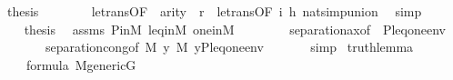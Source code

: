 \begin{isabellebody}
\ {\isacharquery}{\kern0pt}thesis\isanewline
\ \ \ \ \ \ \isamarkupfalse%
\ le{\isacharunderscore}{\kern0pt}trans{\isacharbrackleft}{\kern0pt}OF\ \ {\isacartoucheopen}arity{\isacharparenleft}{\kern0pt}{\isacharquery}{\kern0pt}{\isasympsi}{\isacharparenright}{\kern0pt}\ {\isasymle}\ {\isacharquery}{\kern0pt}r{\isacartoucheclose}\ \ le{\isacharunderscore}{\kern0pt}trans{\isacharbrackleft}{\kern0pt}OF\ i\ h{\isacharbrackright}{\kern0pt}{\isacharbrackright}{\kern0pt}\ nat{\isacharunderscore}{\kern0pt}simp{\isacharunderscore}{\kern0pt}union\ \isamarkupfalse%
\ simp\isanewline
\ \ \isamarkupfalse%
\isanewline
\ \ \isamarkupfalse%
\isanewline
\ \ \isamarkupfalse%
\ {\isacharquery}{\kern0pt}thesis\ \isamarkupfalse%
\ assms\ P{\isacharunderscore}{\kern0pt}in{\isacharunderscore}{\kern0pt}M\ leq{\isacharunderscore}{\kern0pt}in{\isacharunderscore}{\kern0pt}M\ one{\isacharunderscore}{\kern0pt}in{\isacharunderscore}{\kern0pt}M\ \isanewline
\ \ \ \ \ \ \ separation{\isacharunderscore}{\kern0pt}ax{\isacharbrackleft}{\kern0pt}of\ {\isachardoublequoteopen}{\isacharquery}{\kern0pt}{\isasympsi}{\isachardoublequoteclose}\ {\isachardoublequoteopen}{\isacharbrackleft}{\kern0pt}P{\isacharcomma}{\kern0pt}leq{\isacharcomma}{\kern0pt}one{\isacharbrackright}{\kern0pt}{\isacharat}{\kern0pt}env{\isachardoublequoteclose}{\isacharbrackright}{\kern0pt}\ \isanewline
\ \ \ \ \ \ \ separation{\isacharunderscore}{\kern0pt}cong{\isacharbrackleft}{\kern0pt}of\ {\isachardoublequoteopen}{\isacharhash}{\kern0pt}{\isacharhash}{\kern0pt}M{\isachardoublequoteclose}\ {\isachardoublequoteopen}{\isasymlambda}y{\isachardot}{\kern0pt}\ {\isacharparenleft}{\kern0pt}M{\isacharcomma}{\kern0pt}\ {\isacharbrackleft}{\kern0pt}y{\isacharcomma}{\kern0pt}P{\isacharcomma}{\kern0pt}leq{\isacharcomma}{\kern0pt}one{\isacharbrackright}{\kern0pt}{\isacharat}{\kern0pt}env\ {\isasymTurnstile}{\isacharquery}{\kern0pt}{\isasympsi}{\isacharparenright}{\kern0pt}{\isachardoublequoteclose}{\isacharbrackright}{\kern0pt}\isanewline
\ \ \ \ \isamarkupfalse%
\ simp\isanewline
{}\isamarkupfalse%
%
\endisatagproof
{\isafoldproof}%
%
\isadelimproof
\isanewline
%
\endisadelimproof
\isanewline
\isanewline
{}\isamarkupfalse%
\ truth{\isacharunderscore}{\kern0pt}lemma{\isacharcolon}{\kern0pt}\isanewline
\ \ \ \isanewline
\ \ \ \ {\isachardoublequoteopen}{\isasymphi}{\isasymin}formula{\isachardoublequoteclose}\ {\isachardoublequoteopen}M{\isacharunderscore}{\kern0pt}generic{\isacharparenleft}{\kern0pt}G{\isacharparenright}{\kern0pt}{\isachardoublequoteclose}\isanewline

\end{isabellebody}
